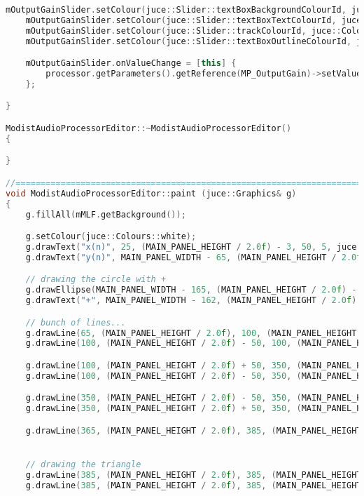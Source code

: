 \documentclass{article}
\begin{document}
\begin{appendix}
\begin{lstlisting}[language=C++]
    mOutputGainSlider.setColour(juce::Slider::textBoxBackgroundColourId, juce::Colours::black.brighter(0.09));
    mOutputGainSlider.setColour(juce::Slider::textBoxTextColourId, juce::Colours::white);
    mOutputGainSlider.setColour(juce::Slider::trackColourId, juce::Colours::transparentWhite);
    mOutputGainSlider.setColour(juce::Slider::textBoxOutlineColourId, juce::Colours::transparentWhite);

    mOutputGainSlider.onValueChange = [this] {
        processor.getParameters().getReference(MP_OutputGain)->setValue(mOutputGainSlider.getValue());
    };

}

ModistAudioProcessorEditor::~ModistAudioProcessorEditor()
{

}

//==============================================================================
void ModistAudioProcessorEditor::paint (juce::Graphics& g)
{
    g.fillAll(mMLF.getBackground());

    g.setColour(juce::Colours::white);
    g.drawText("x(n)", 25, (MAIN_PANEL_HEIGHT / 2.0f) - 3, 50, 5, juce::Justification::centred);
    g.drawText("y(n)", MAIN_PANEL_WIDTH - 65, (MAIN_PANEL_HEIGHT / 2.0f) - 3, 50, 5, juce::Justification::centred);

    // drawing the circle with +
    g.drawEllipse(MAIN_PANEL_WIDTH - 165, (MAIN_PANEL_HEIGHT / 2.0f) - 15, 30, 30, 1);
    g.drawText("+", MAIN_PANEL_WIDTH - 162, (MAIN_PANEL_HEIGHT / 2.0f) - 3, 25, 5, juce::Justification::centred);

    // bunch of lines...
    g.drawLine(65, (MAIN_PANEL_HEIGHT / 2.0f), 100, (MAIN_PANEL_HEIGHT / 2.0f));
    g.drawLine(100, (MAIN_PANEL_HEIGHT / 2.0f) - 50, 100, (MAIN_PANEL_HEIGHT / 2.0f) + 50);

    g.drawLine(100, (MAIN_PANEL_HEIGHT / 2.0f) + 50, 350, (MAIN_PANEL_HEIGHT / 2.0f) + 50);
    g.drawLine(100, (MAIN_PANEL_HEIGHT / 2.0f) - 50, 350, (MAIN_PANEL_HEIGHT / 2.0f) - 50);

    g.drawLine(350, (MAIN_PANEL_HEIGHT / 2.0f) - 50, 350, (MAIN_PANEL_HEIGHT / 2.0f) - 15);
    g.drawLine(350, (MAIN_PANEL_HEIGHT / 2.0f) + 50, 350, (MAIN_PANEL_HEIGHT / 2.0f) + 15);

    g.drawLine(365, (MAIN_PANEL_HEIGHT / 2.0f), 385, (MAIN_PANEL_HEIGHT / 2.0f));


    // drawing the triangle
    g.drawLine(385, (MAIN_PANEL_HEIGHT / 2.0f), 385, (MAIN_PANEL_HEIGHT / 2.0f) + 25);
    g.drawLine(385, (MAIN_PANEL_HEIGHT / 2.0f), 385, (MAIN_PANEL_HEIGHT / 2.0f) - 25);


\end{lstlisting}
\end{appendix}
\end{document}
